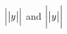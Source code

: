 \documentclass{article}
\DeclarePairedDelimiter{\abs}{\lvert}{\rvert}
\begin{document}
$\Bigl\lvert\bigl\lvert y\bigr\rvert\Bigr\rvert$ and $\abs[\bigg]{\abs[\big]{y}}$
\end{document}
